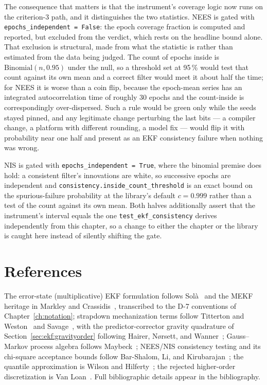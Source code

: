 The consequence that matters is that the instrument's coverage logic now
runs on the criterion-3 path, and it distinguishes the two statistics. NEES
is gated with \texttt{epochs\_independent = False}: the epoch coverage
fraction is computed and reported, but excluded from the verdict, which
rests on the headline bound alone. That exclusion is structural, made from
what the statistic is rather than estimated from the data being judged. The
count of epochs inside is $\mathrm{Binomial}(n, 0.95)$ under the null, so a
threshold set at 95\,\% would test that count against its own mean and a
correct filter would meet it about half the time; for NEES it is worse than
a coin flip, because the epoch-mean series has an integrated
autocorrelation time of roughly 30 epochs and the count-inside is
correspondingly over-dispersed. Such a rule would be green only while the
seeds stayed pinned, and any legitimate change perturbing the last bits ---
a compiler change, a platform with different rounding, a model fix ---
would flip it with probability near one half and present as an EKF
consistency failure when nothing was wrong.

NIS is gated with \texttt{epochs\_independent = True}, where the binomial
premise does hold: a consistent filter's innovations are white, so
successive epochs are independent and
\texttt{consistency.inside\_count\_threshold} is an exact bound on the
spurious-failure probability at the library's default $c = 0.999$ rather
than a test of the count against its own mean. Both halves additionally
assert that the instrument's interval equals the one
\texttt{test\_ekf\_consistency} derives independently from this chapter, so
a change to either the chapter or the library is caught here instead of
silently shifting the gate.

\section{References}
\label{sec:ekf:references}

The error-state (multiplicative) EKF formulation follows
Sol\`a~\cite{sola2017} and the MEKF heritage in Markley and
Crassidis~\cite{markley2014}, transcribed to the D-7 conventions of
Chapter~\ref{ch:notation}; strapdown mechanization terms follow
Titterton and Weston~\cite{titterton2004} and
Savage~\cite{savage1998b}, with the predictor-corrector gravity
quadrature of Section~\ref{sec:ekf:gravityorder} following Hairer,
N\o{}rsett, and Wanner~\cite{hairer1993}; Gauss--Markov process algebra
follows Maybeck~\cite{maybeck1979}; NEES/NIS consistency testing and its
chi-square acceptance bounds follow Bar-Shalom, Li, and
Kirubarajan~\cite{barshalom2001}; the quantile approximation is
Wilson and Hilferty~\cite{wilson1931}; the rejected higher-order
discretization is Van Loan~\cite{vanloan1978}. Full bibliographic
details appear in the bibliography.
